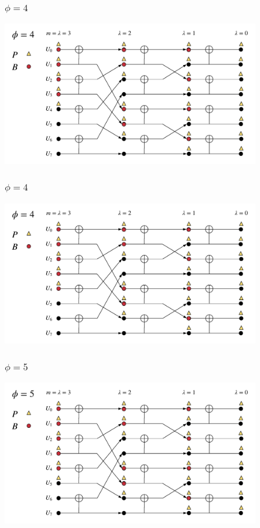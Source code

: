 \documentclass{beamer}
\begin{document}
\begin{frame}
\frametitle{$\phi=4$}
  \begin{center}
  \includegraphics[width=0.85\textwidth]{scl_pics/CalcP_4.png}
  \end{center}
\end{frame}

\begin{frame}
\frametitle{$\phi=4$}
  \begin{center}
  \includegraphics[width=0.85\textwidth]{scl_pics/UpdateB_4.png}
  \end{center}
\end{frame}

\begin{frame}
\frametitle{$\phi=5$}
  \begin{center}
  \includegraphics[width=0.85\textwidth]{scl_pics/CalcP_5.png}
  \end{center}
\end{frame}
\end{document}
